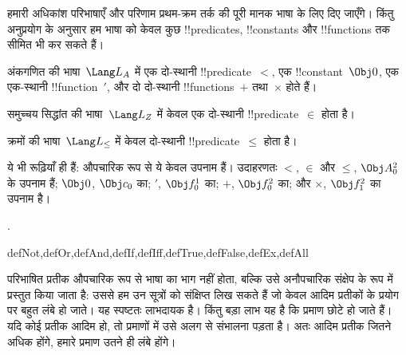 \documentclass[../../../include/open-logic-section]{subfiles}
\begin{document}
हमारी अधिकांश परिभाषाएँ और परिणाम प्रथम-क्रम तर्क की पूरी मानक भाषा के लिए
दिए जाएँगे। किंतु अनुप्रयोग के अनुसार हम भाषा को केवल कुछ !!{predicate}s,
!!{constant}s और !!{function}s तक सीमित भी कर सकते हैं।

\begin{ex}
अंकगणित की भाषा~$\Lang L_A$ में एक दो-स्थानी !!{predicate}~$<$, एक
!!{constant}~$\Obj 0$, एक एक-स्थानी !!{function}~$\prime$, और दो दो-स्थानी
!!{function}s~$+$ तथा~$\times$ होते हैं।
\end{ex}

\begin{ex}
समुच्चय सिद्धांत की भाषा~$\Lang L_Z$ में केवल एक दो-स्थानी
!!{predicate}~$\in$ होता है।
\end{ex}

\begin{ex}
क्रमों की भाषा~$\Lang L_\le$ में केवल दो-स्थानी !!{predicate}~$\le$ होता है।
\end{ex}

ये भी रूढ़ियाँ ही हैं: औपचारिक रूप से ये केवल उपनाम हैं। उदाहरणतः $<$,
$\in$ और $\le$, $\Obj A^2_0$ के उपनाम हैं; $\Obj 0$, $\Obj c_0$ का;
$\prime$, $\Obj f^1_0$ का; $+$, $\Obj f^2_0$ का; और $\times$,
$\Obj f^2_1$ का उपनाम है।

.

\begin{tagblock}{defNot,defOr,defAnd,defIf,defIff,defTrue,defFalse,defEx,defAll}
\begin{explain}
परिभाषित प्रतीक औपचारिक रूप से भाषा का भाग नहीं होता, बल्कि उसे अनौपचारिक
संक्षेप के रूप में प्रस्तुत किया जाता है: उससे हम उन सूत्रों को संक्षिप्त लिख
सकते हैं जो केवल आदिम प्रतीकों के प्रयोग पर बहुत लंबे हो जाते। यह स्पष्टतः
लाभदायक है। किंतु बड़ा लाभ यह है कि प्रमाण छोटे हो जाते हैं। यदि कोई प्रतीक
आदिम हो, तो प्रमाणों में उसे अलग से संभालना पड़ता है। अतः आदिम प्रतीक जितने
अधिक होंगे, हमारे प्रमाण उतने ही लंबे होंगे।
\end{explain}
\end{tagblock}
\end{document}
